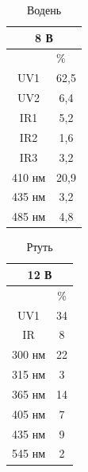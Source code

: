 \documentclass[a4paper,14pt]{extreport}
\begin{document}
		
\begin{table}[h!]
	\begin{center}
	\caption{Водень}
		\begin{tabular}{|c|c|}
		\hline
		\multicolumn{2}{|c|}{8 В}                       \\ \hline
		\multicolumn{1}{|l|}{} & \multicolumn{1}{l|}{\%} \\ \hline
		UV1                    & 62,5                    \\ \hline
		UV2                    & 6,4                    \\ \hline
		IR1                    & 5,2                    \\ \hline
		IR2                    & 1,6                    \\ \hline
		IR3                    & 3,2                    \\ \hline
		410  нм                & 20,9                     \\ \hline
		435 нм                 & 3,2                     \\ \hline
		485 нм                 & 4,8                     \\ \hline
		\end{tabular}
	\end{center}
\end{table}
\begin{table}[h!]
 \caption{Ртуть}
	\begin{center}
		\begin{tabular}{|c|c|}
		
		\hline
		\multicolumn{2}{|c|}{12 В}                              \\ \hline
		                             & \%                       \\ \hline
		UV1                          & 34                     \\ \hline
		IR                           & 8                      \\ \hline
		300 нм                       & 22                     \\ \hline
		315 нм                       & 3                     \\ \hline
		365 нм                       & 14                     \\ \hline
		405 нм                       & 7                    \\ \hline
		435 нм                       & 9                     \\ \hline
		545 нм & 2 \\ \hline
		\end{tabular}
	\end{center}
\end{table}
\newpage
\end{document}

